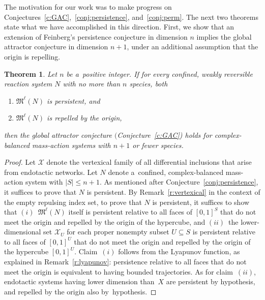 \documentclass[pdftex]{sigma}
\newtheorem{Theorem}{Theorem}[section]
\begin{document}
The motivation for our work was to make progress on Conjectures~\ref{c:GAC},~\ref{conj:persistence},
and~\ref{conj:perm}.
The next two theorems state what we have accomplished in this direction.
First, we show that an extension of Feinberg's persistence conjecture in dimension $n$ implies the global attractor
conjecture in dimension $n+1$, under an additional assumption that the origin is repelling.
\begin{Theorem}
\label{t:n=>n+1}
Let $n$ be a~positive integer.
If for every confined, weakly reversible reaction system $N$ with no more than $n$ species, both
\begin{enumerate}\itemsep=0pt
\item[$1)$] $\mathfrak M^\ell(N)$ is persistent, and
\item[$2)$] $\mathfrak M^\ell(N)$ is repelled by the origin,
\end{enumerate}
then the global attractor conjecture $($Conjecture~{\rm \ref{c:GAC})} holds for complex-balanced mass-action systems with $n+1$
or fewer species.
\end{Theorem}
\begin{proof}
Let $\mathcal X$ denote the vertexical family of all dif\/ferential inclusions that arise from endotactic networks.
Let $N$ denote a~conf\/ined, complex-balanced mass-action system with $|S|\leq n+1$.
As mentioned after Conjecture~\ref{conj:persistence}, it suf\/f\/ices to prove that $N$ is persistent.
By Remark~\ref{r:vertexical} in the context of the empty repulsing index set, to prove that $N$ is persistent, it
suf\/f\/ices to show that $(i)$~$\mathfrak M^\ell(N)$ itself is persistent relative to all faces of $[0,1]^S$ that do not
meet the origin and repelled by the origin of the hypercube, and $(ii)$~the lower-dimensional set $\mathcal X_U$ for
each proper nonempty subset $U\subseteq S$ is persistent relative to all faces of $[0,1]^U$ that do not meet the origin
and repelled by the origin of the hypercube $[0,1]^U$.
Claim~$(i)$ follows from the Lyapunov function, as explained in Remark~\ref{r:lyapunov}: persistence relative to all
faces that do not meet the origin is equivalent to having bounded trajectories.
As for claim~$(ii)$, endotactic systems having lower dimension than~$X$ are persistent by hypothesis, and repelled by the
origin also by~hypothesis.
\end{proof}
\end{document}
